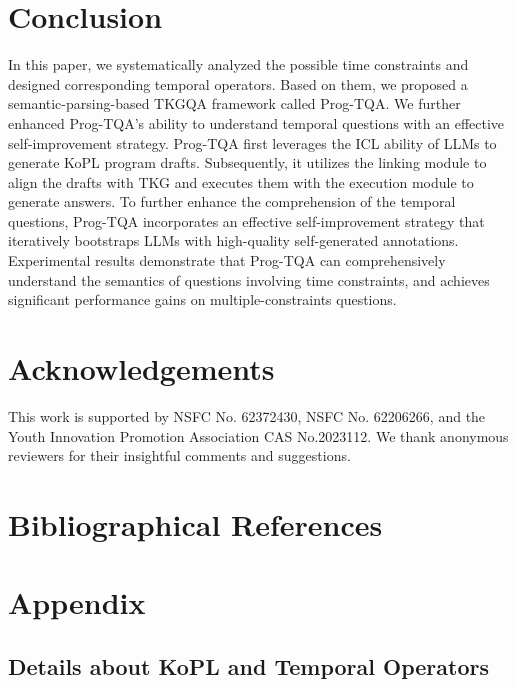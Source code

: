 \documentclass[10pt, a4paper]{article}
\begin{document}
\section{Conclusion}
In this paper, we systematically analyzed the possible time constraints and designed corresponding temporal operators. Based on them, we proposed a semantic-parsing-based TKGQA framework called Prog-TQA. We further enhanced Prog-TQA's ability to understand temporal questions with an effective self-improvement strategy.
Prog-TQA first leverages the ICL ability of LLMs to generate KoPL program drafts. Subsequently, it utilizes the linking module to align the drafts with TKG and executes them with the execution module to generate answers. To further enhance the comprehension of the temporal questions, Prog-TQA incorporates an effective self-improvement strategy that iteratively bootstraps LLMs with high-quality self-generated annotations. Experimental results demonstrate that Prog-TQA can comprehensively understand the semantics of questions involving time constraints, and achieves significant performance gains on multiple-constraints questions.

\section{Acknowledgements}
This work is supported by NSFC No. 62372430, NSFC No. 62206266, and the Youth Innovation Promotion Association CAS No.2023112. We thank anonymous reviewers for their insightful comments and suggestions.

\nocite{*}
\section{Bibliographical References}\label{sec:reference}




\appendix
\section{Appendix}
\subsection{Details about KoPL and Temporal Operators}\label{app:tempop}
\end{document}
